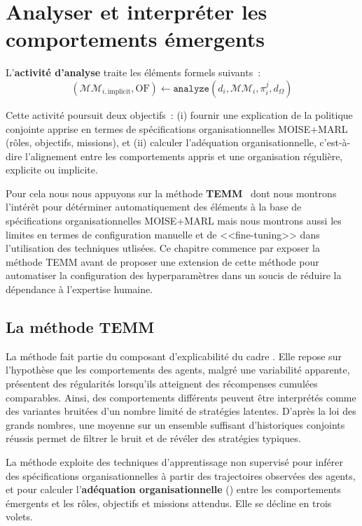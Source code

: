 \clearpage
\thispagestyle{empty}
\null
\newpage

\chapter{Analyser et interpréter les comportements émergents}
\label{chap:analyzing}

\noindent L'\textbf{activité d'analyse} traite les éléments formels suivants~:
\[
  (\mathcal{MM}_{i,\text{implicit}}, \text{OF}) \gets \texttt{analyze}(d_i, \mathcal{MM}_i, \pi^j_i, d_\Omega)
\]

\noindent Cette activité poursuit deux objectifs~: (i) fournir une explication de la politique conjointe apprise en termes de spécifications organisationnelles MOISE+MARL (rôles, objectifs, missions), et (ii) calculer l'adéquation organisationnelle, c'est-à-dire l'alignement entre les comportements appris et une organisation régulière, explicite ou implicite.

Pour cela nous nous appuyons sur la méthode \textbf{TEMM}~\cite{soule2025moisemarl} dont nous montrons l’intérêt pour détérminer automatiquement des éléments à la base de spécifications organisationnelles MOISE+MARL mais nous montrons aussi les limites en termes de configuration manuelle et de <<fine-tuning>> dans l'utilisation des techniques  utlisées. Ce chapitre commence par exposer la méthode TEMM avant de proposer une extension de cette méthode pour automatiser la configuration des hyperparamètres dans un soucis de réduire la dépendance à l'expertise humaine.

\section{La méthode TEMM}
\label{sec:TEMM_algorithm}

La méthode  fait partie du composant d'explicabilité du cadre . Elle repose sur l’hypothèse que les comportements des agents, malgré une variabilité apparente, présentent des régularités lorsqu'ils atteignent des récompenses cumulées comparables. Ainsi, des comportements différents peuvent être interprétés comme des variantes bruitées d'un nombre limité de stratégies latentes. D’après la loi des grands nombres, une moyenne sur un ensemble suffisant d’historiques conjoints réussis permet de filtrer le bruit et de révéler des stratégies typiques.

La méthode exploite des techniques d’apprentissage non supervisé pour inférer des spécifications organisationnelles à partir des trajectoires observées des agents, et pour calculer l’\textbf{adéquation organisationnelle} () entre les comportements émergents et les rôles, objectifs et missions attendus. Elle se décline en trois volets.

